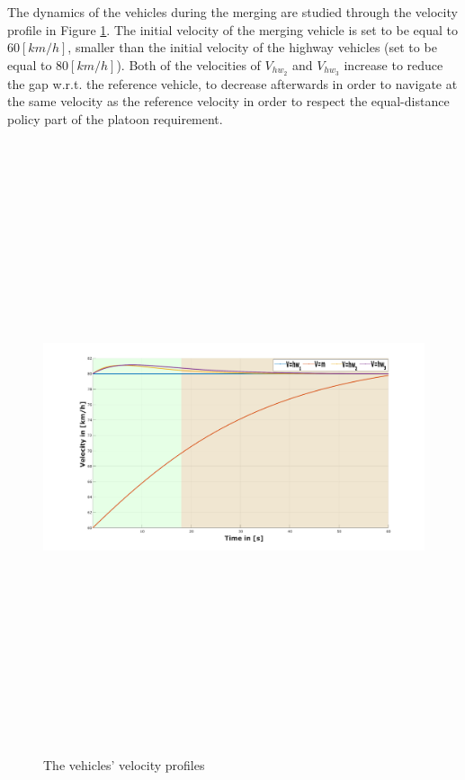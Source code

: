 The dynamics of the vehicles during the merging are studied through the velocity profile in Figure \ref{fig:FRA-OCS:velocity}. The initial velocity of the merging vehicle is set to be equal to $60 [km/h]$, smaller than the initial velocity of the highway vehicles (set to be equal to $80 [km/h]$). Both of the velocities of $V_{hw_2}$ and $V_{hw_3}$ increase to reduce the gap w.r.t. the reference vehicle, to decrease afterwards in order to navigate at the same velocity as the reference velocity in order to respect the equal-distance policy part of the platoon requirement.  
        \begin{figure}[!h]
        \centering 
        \includegraphics[width=11.5cm,height=18cm,keepaspectratio]{chapters/Chapitre_5/Figures/FRA-OCS/velocity.pdf}
        \caption{The vehicles' velocity profiles}
        \label{fig:FRA-OCS:velocity}
        \end{figure}

